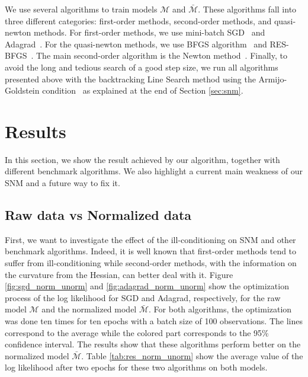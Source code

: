 \documentclass[conference]{IEEEtran}
\begin{document}
We use several algorithms to train models $\mathcal{M}$ and $\bar{\mathcal{M}}$. These algorithms fall into three different categories: first-order methods, second-order methods, and quasi-newton methods. For first-order methods, we use mini-batch SGD~\cite{ruder_overview_2016} and Adagrad~\cite{duchi_adaptive_2011}. For the quasi-newton methods, we use BFGS algorithm~\cite{fletcher_practical_1987} and RES-BFGS~\cite{mokhtari_res:_2014}. The main second-order algorithm is the Newton method~\cite{caswell_treatise_1685}. Finally, to avoid the long and tedious search of a good step size, we run all algorithms presented above with the backtracking Line Search method using the Armijo-Goldstein condition~\cite{armijo_minimization_1966} as explained at the end of Section \ref{sec:snm}. \\

\section{Results}
\label{sec:res}

In this section, we show the result achieved by our algorithm, together with different benchmark algorithms. We also highlight a current main weakness of our SNM and a future way to fix it.

\subsection{Raw data vs Normalized data}
\label{sec:norm_unorm}

First, we want to investigate the effect of the ill-conditioning on SNM and other benchmark algorithms. Indeed, it is well known that first-order methods tend to suffer from ill-conditioning while second-order methods, with the information on the curvature from the Hessian, can better deal with it. Figure \ref{fig:sgd_norm_unorm} and \ref{fig:adagrad_norm_unorm} show the optimization process of the log likelihood for SGD and Adagrad, respectively, for the raw model $\mathcal{M}$ and the normalized model $\bar{\mathcal{M}}$. For both algorithms, the optimization was done ten times for ten epochs with a batch size of 100 observations. The lines correspond to the average while the colored part corresponds to the 95\% confidence interval. The results show that these algorithms perform better on the normalized model $\bar{\mathcal{M}}$. Table \ref{tab:res_norm_unorm} show the average value of the log likelihood after two epochs for these two algorithms on both models.
\end{document}
